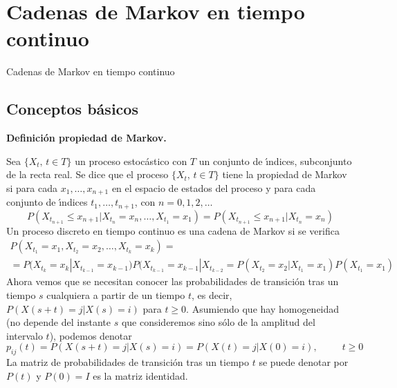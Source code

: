 \chapter{Cadenas de Markov en tiempo continuo}
{Cadenas de Markov en tiempo continuo}\thispagestyle{empty}
\section{Conceptos b\'{a}sicos}
{\bf Definici\'{o}n propiedad de Markov.}
\par
Sea $\{X_t,\,t\in T\}$ un proceso estoc\'{a}stico con $T$ un conjunto
de \'{\i}ndices, subconjunto de la recta real. Se dice que el proceso
$\{X_t,\,t\in T\}$ tiene la propiedad de Markov si para cada
$x_1,\ldots,x_{n+1}$ en el espacio de estados del proceso y para
cada conjunto de \'{\i}ndices $t_1,\ldots,t_{n+1}$, con
$n=0,1,2,\ldots$
\[
P(X_{t_{n+1}}\leq x_{n+1}| X_{t_n}=x_n,\ldots,X_{t_1}=x_1)=
P(X_{t_{n+1}}\leq x_{n+1}| X_{t_n}=x_n)
\]
Un proceso discreto en tiempo continuo es una cadena de Markov si
se verifica
\[
\begin{array}{l}
P(X_{t_1}=x_1,X_{t_2}=x_2,\ldots,X_{t_k}=x_k)
=\\[10pt]%
=P(X_{t_k}=x_k|X_{t_{k-1}}=x_{k-1})
P(X_{t_{k-1}}=x_{k-1}|X_{t_{k-2}}=
P(X_{t_2}=x_2|X_{t_1}=x_1)P(X_{t_1}=x_1)
\end{array}
\]
Ahora vemos que se necesitan conocer las probabilidades de
transici\'{o}n tras un tiempo $s$ cualquiera a partir de un tiempo
$t$, es decir, $P(X(s+t)=j|X(s)=i)$ para $t\geq 0$. Asumiendo que
hay homogeneidad (no depende del instante $s$ que consideremos
sino s\'{o}lo de la amplitud del intervalo $t$), podemos denotar
\[
p_{ij}(t) = P(X(s+t) = j | X(s) = i ) = P( X(t)=j | X(0)=i
),\hspace{30pt} t\geq 0
\]
La matriz de probabilidades de transici\'{o}n tras un tiempo $t$ se
puede denotar por $P(t)$ y $P(0)=I$ es la matriz identidad.
